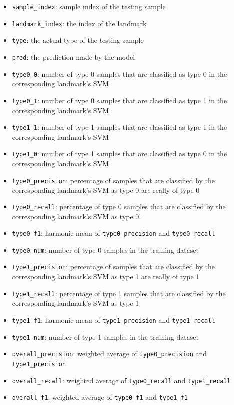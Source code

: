 \documentclass[10pt,letterpaper]{article}
\providecommand{\tightlist}{%
  \setlength{\itemsep}{0pt}\setlength{\parskip}{0pt}}
\begin{document}
\begin{itemize}
\tightlist
\item
  \texttt{sample\_index}: sample index of the testing sample
\item
  \texttt{landmark\_index}: the index of the landmark
\item
  \texttt{type}: the actual type of the testing sample
\item
  \texttt{pred}: the prediction made by the model
\item
  \texttt{type0\_0}: number of type 0 samples that are classified as
  type 0 in the corresponding landmark's SVM
\item
  \texttt{type0\_1}: number of type 0 samples that are classified as
  type 1 in the corresponding landmark's SVM
\item
  \texttt{type1\_1}: number of type 1 samples that are classified as
  type 1 in the corresponding landmark's SVM
\item
  \texttt{type1\_0}: number of type 1 samples that are classified as
  type 0 in the corresponding landmark's SVM
\item
  \texttt{type0\_precision}: percentage of samples that are classified
  by the corresponding landmark's SVM as type 0 are really of type 0
\item
  \texttt{type0\_recall}: percentage of type 0 samples that are
  classified by the corresponding landmark's SVM as type 0.
\item
  \texttt{type0\_f1}: harmonic mean of \texttt{type0\_precision} and
  \texttt{type0\_recall}
\item
  \texttt{type0\_num}: number of type 0 samples in the training dataset
\item
  \texttt{type1\_precision}: percentage of samples that are classified
  by the corresponding landmark's SVM as type 1 are really of type 1
\item
  \texttt{type1\_recall}: percentage of type 1 samples that are
  classified by the corresponding landmark's SVM as type 1
\item
  \texttt{type1\_f1}: harmonic mean of \texttt{type1\_precision} and
  \texttt{type1\_recall}
\item
  \texttt{type1\_num}: number of type 1 samples in the training dataset
\item
  \texttt{overall\_precision}: weighted average of
  \texttt{type0\_precision} and \texttt{type1\_precision}
\item
  \texttt{overall\_recall}: weighted average of \texttt{type0\_recall}
  and \texttt{type1\_recall}
\item
  \texttt{overall\_f1}: weighted average of \texttt{type0\_f1} and
  \texttt{type1\_f1}
\end{itemize}
\end{document}
